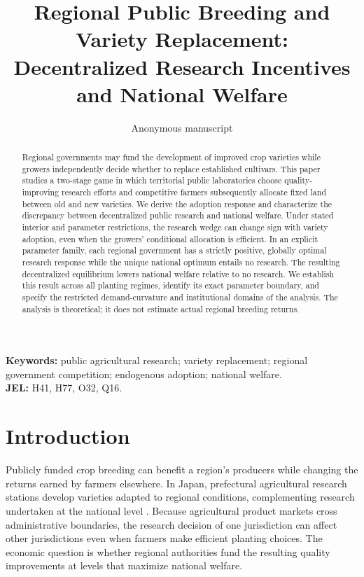 \documentclass[11pt,a4paper]{article}
\title{Regional Public Breeding and Variety Replacement: Decentralized Research Incentives and National Welfare}
\author{Anonymous manuscript}
\date{}
\begin{document}
\maketitle
\begin{abstract}
Regional governments may fund the development of improved crop varieties while growers independently decide whether to replace established cultivars. This paper studies a two-stage game in which territorial public laboratories choose quality-improving research efforts and competitive farmers subsequently allocate fixed land between old and new varieties. We derive the adoption response and characterize the discrepancy between decentralized public research and national welfare. Under stated interior and parameter restrictions, the research wedge can change sign with variety adoption, even when the growers' conditional allocation is efficient. In an explicit parameter family, each regional government has a strictly positive, globally optimal research response while the unique national optimum entails no research. The resulting decentralized equilibrium lowers national welfare relative to no research. We establish this result across all planting regimes, identify its exact parameter boundary, and specify the restricted demand-curvature and institutional domains of the analysis. The analysis is theoretical; it does not estimate actual regional breeding returns.
\end{abstract}

\noindent\textbf{Keywords:} public agricultural research; variety replacement; regional government competition; endogenous adoption; national welfare.\\
\textbf{JEL:} H41, H77, O32, Q16.

\section{Introduction}
Publicly funded crop breeding can benefit a region's producers while changing the returns earned by farmers elsewhere. In Japan, prefectural agricultural research stations develop varieties adapted to regional conditions, complementing research undertaken at the national level \citep{oecd2019japan}. Because agricultural product markets cross administrative boundaries, the research decision of one jurisdiction can affect other jurisdictions even when farmers make efficient planting choices. The economic question is whether regional authorities fund the resulting quality improvements at levels that maximize national welfare.
\end{document}
